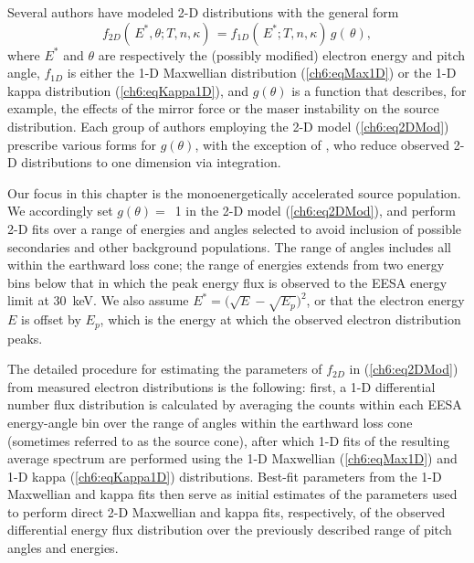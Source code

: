   Several authors \citep{Maggs1981,Bingham1999,Bingham2000,Mutel2007} have
  modeled 2-D distributions with the general form
    \begin{equation} \label{ch6:eq2DMod} f_{2D}(\, E^*, \theta ; T, n,
      \kappa) \, = f_{1D}(\, E^*; T, n, \kappa) \, g(\, \theta),
    \end{equation}
  where $E^*$ and $\theta$ are respectively the (possibly modified) electron
  energy and pitch angle, $f_{1D}$ is either the 1-D Maxwellian distribution
  (\ref{ch6:eqMax1D}) or the 1-D kappa distribution (\ref{ch6:eqKappa1D}), and
  $g(\theta )$ is a function that describes, for example, the effects of the
  mirror force or the maser instability on the source distribution. Each group
  of authors employing the 2-D model (\ref{ch6:eq2DMod}) prescribe various forms
  for $g(\theta)$, with the exception of \citet{Pritchett1999}, who reduce
  observed 2-D distributions to one dimension via integration.

  Our focus in this chapter is the monoenergetically accelerated source
  population. We accordingly set $g(\theta) =$~1 in the 2-D model
  (\ref{ch6:eq2DMod}), and perform 2-D fits over a range of energies and angles
  selected to avoid inclusion of possible secondaries and other background
  populations. The range of angles includes all within the earthward loss cone;
  the range of energies extends from two energy bins below that in which the
  peak energy flux is observed to the EESA energy limit at 30~keV. We also
  assume $E^* = \big( \sqrt{E} - \sqrt{E_p} \big)^2$, or that the electron
  energy $E$ is offset by $E_p$, which is the energy at which the observed
  electron distribution peaks.

  The detailed procedure for estimating the parameters of $f_{2D}$ in
  (\ref{ch6:eq2DMod}) from measured electron distributions is the following:
  first, a 1-D differential number flux distribution is calculated by averaging
  the counts within each EESA energy-angle bin over the range of angles within
  the earthward loss cone (sometimes referred to as the source cone), after
  which 1-D fits of the resulting average spectrum are performed using the 1-D
  Maxwellian (\ref{ch6:eqMax1D}) and 1-D kappa (\ref{ch6:eqKappa1D})
  distributions. Best-fit parameters from the 1-D Maxwellian and kappa fits then
  serve as initial estimates of the parameters used to perform direct 2-D
  Maxwellian and kappa fits, respectively, of the observed differential energy
  flux distribution over the previously described range of pitch angles and
  energies. 
\DIFaddbegin 

